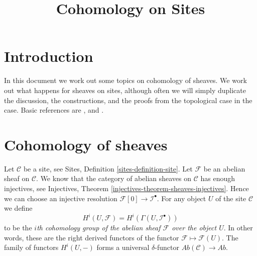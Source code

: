 

%


\title{Cohomology on Sites}


\maketitle

\label{section-phantom}

\tableofcontents

\section{Introduction}
\label{section-introduction}

\noindent
In this document we work out some topics on cohomology of sheaves.
We work out what happens for sheaves on sites,
although often we will simply duplicate the discussion,
the constructions, and the proofs from the topological
case in the case.
Basic references are \cite{SGA4}, \cite{Godement} and \cite{Iversen}.




\section{Cohomology of sheaves}
\label{section-cohomology-sheaves}

\noindent
Let $\mathcal{C}$ be a site, see
Sites, Definition \ref{sites-definition-site}.
Let $\mathcal{F}$ be an abelian sheaf on $\mathcal{C}$.
We know that the category of abelian sheaves on $\mathcal{C}$
has enough injectives, see
Injectives, Theorem \ref{injectives-theorem-sheaves-injectives}.
Hence we can choose an injective resolution
$\mathcal{F}[0] \to \mathcal{I}^\bullet$.
For any object $U$ of the site $\mathcal{C}$ we define
\begin{equation}
\label{equation-cohomology-object-site}
H^i(U, \mathcal{F}) = H^i(\Gamma(U, \mathcal{I}^\bullet))
\end{equation}
to be the {\it $i$th cohomology group of the abelian sheaf
$\mathcal{F}$ over the object $U$}. In other words, these are the
right derived functors of the functor $\mathcal{F} \mapsto \mathcal{F}(U)$.
The family of functors $H^i(U, -)$ forms a universal $\delta$-functor
$\textit{Ab}(\mathcal{C}) \to \textit{Ab}$.

